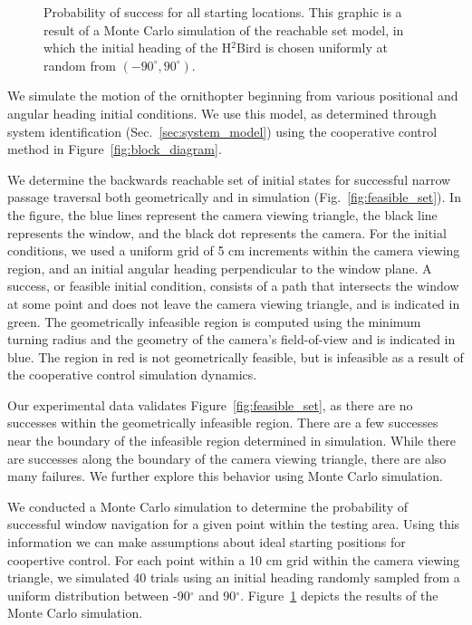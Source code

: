 \documentclass{aamas2013}
\begin{document}
\begin{figure}[tb]
\begin{minipage}[b]{0.45\linewidth}
\caption{Probability of success for all starting locations. This graphic is 
a result of a Monte Carlo simulation of the reachable set model, in which the 
initial heading of the H$^2$Bird is chosen uniformly at random from $(-90^{\circ},90^{\circ})$.}
\label{fig:heat_map}
\end{minipage}
\end{figure}

We simulate the motion of the ornithopter beginning from various positional 
and angular heading initial conditions. We use this model, as determined 
through system identification (Sec.~\ref{sec:system_model}) using the 
cooperative control method in Figure~\ref{fig:block_diagram}.

We determine the backwards reachable set of initial states for successful 
narrow passage traversal both geometrically and in simulation 
(Fig.~\ref{fig:feasible_set}). In the figure, the blue lines represent the 
camera viewing triangle, the black line represents the window, and the black 
dot represents the camera. For the initial conditions, we used a uniform
grid of 5 cm increments within the camera viewing region, and an initial
angular heading perpendicular to the window plane. A success, or feasible 
initial condition, consists of a path that intersects the window at some 
point and does not leave the camera viewing triangle, and is indicated in 
green. The geometrically infeasible region is computed using the minimum 
turning radius and the geometry of the camera's field-of-view and is 
indicated in blue. The region in red is not geometrically feasible, but is 
infeasible as a result of the cooperative control simulation dynamics.

Our experimental data validates Figure~\ref{fig:feasible_set}, as there are 
no successes within the geometrically infeasible region. There are a few 
successes near the boundary of the infeasible region determined in 
simulation. While there are successes along the boundary of the camera 
viewing triangle, there are also many failures. We further explore this 
behavior using Monte Carlo simulation.

We conducted a Monte Carlo simulation to determine the probability of 
successful window navigation for a given point within the testing area. 
Using this information we can make assumptions about ideal starting 
positions for coopertive control. For each point within a 10 cm grid within 
the camera viewing triangle, we simulated 40 trials using an initial heading 
randomly sampled from a uniform distribution between -90$^{\circ}$ and 
90$^{\circ}$. Figure~\ref{fig:heat_map} depicts the results of the Monte 
Carlo simulation.
\end{document}
